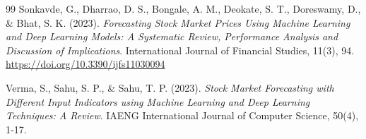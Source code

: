 \documentclass[12pt,a4paper]{report}
\begin{document}
\begin{thebibliography}{99}
Sonkavde, G., Dharrao, D. S., Bongale, A. M., Deokate, S. T., Doreswamy, D., \& Bhat, S. K. (2023). \emph{Forecasting Stock Market Prices Using Machine Learning and Deep Learning Models: A Systematic Review, Performance Analysis and Discussion of Implications}. International Journal of Financial Studies, 11(3), 94. \url{https://doi.org/10.3390/ijfs11030094}

Verma, S., Sahu, S. P., \& Sahu, T. P. (2023). \emph{Stock Market Forecasting with Different Input Indicators using Machine Learning and Deep Learning Techniques: A Review}. IAENG International Journal of Computer Science, 50(4), 1-17.

\end{thebibliography}
\end{document}
